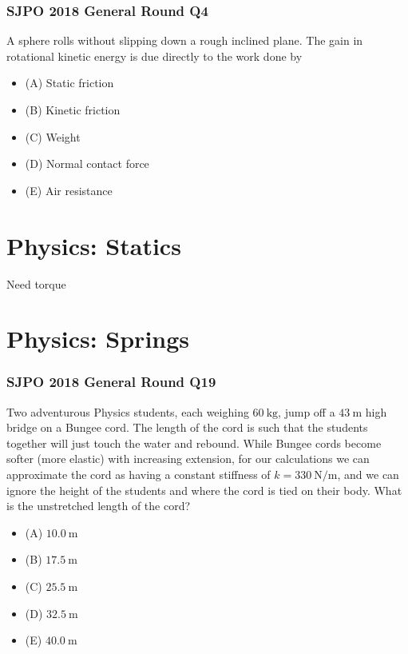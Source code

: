 \documentclass{article}
\begin{document}
\subsubsection{SJPO 2018 General Round Q4}
A sphere rolls without slipping down a rough inclined plane. The gain in rotational kinetic energy is due directly to the work done by
\begin{itemize}
\item[](A) Static friction
\item[](B) Kinetic friction
\item[](C) Weight
\item[](D) Normal contact force
\item[](E) Air resistance
\end{itemize}

\section{Physics: Statics}
Need torque
\section{Physics: Springs}
\subsubsection{SJPO 2018 General Round Q19}
Two adventurous Physics students, each weighing $60 \mathrm{~kg}$, jump off a $43 \mathrm{~m}$ high bridge on a Bungee cord. The length of the cord is such that the students together will just touch the water and rebound. While Bungee cords become softer (more elastic) with increasing extension, for our calculations we can approximate the cord as having a constant stiffness of $k=330 \mathrm{~N} / \mathrm{m}$, and we can ignore the height of the students and where the cord is tied on their body. What is the unstretched length of the cord?
\begin{itemize}
\item[] (A) $10.0 \mathrm{~m}$
\item[] (B) $17.5 \mathrm{~m}$
\item[] (C) $25.5 \mathrm{~m}$
\item[] (D) $32.5 \mathrm{~m}$
\item[] (E) $40.0 \mathrm{~m}$
\end{itemize}
\end{document}
